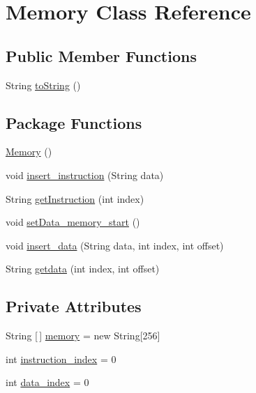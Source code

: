 \hypertarget{class_memory}{}\section{Memory Class Reference}
\label{class_memory}
\subsection*{Public Member Functions}
\begin{DoxyCompactItemize}
\item 
String \mbox{\hyperlink{class_memory_a45c16fbed000105573cba5d6b1f4e727}{to\+String}} ()
\end{DoxyCompactItemize}
\subsection*{Package Functions}
\begin{DoxyCompactItemize}
\item 
\mbox{\hyperlink{class_memory_a18ff0d806d11ea959fbb5e6357a1f63e}{Memory}} ()
\item 
void \mbox{\hyperlink{class_memory_a979bee79db15f41dc1300916ef561118}{insert\+\_\+instruction}} (String data)
\item 
String \mbox{\hyperlink{class_memory_a73c54ab9efefebf18ff0d8722dbe80e3}{get\+Instruction}} (int index)
\item 
void \mbox{\hyperlink{class_memory_a51acd7ce510413dc6834e9c5d383ae73}{set\+Data\+\_\+memory\+\_\+start}} ()
\item 
void \mbox{\hyperlink{class_memory_a29f109643d88d66008afc916eae6cea6}{insert\+\_\+data}} (String data, int index, int offset)
\item 
String \mbox{\hyperlink{class_memory_ac543412608c09b39b93b1e30a3b831a2}{getdata}} (int index, int offset)
\end{DoxyCompactItemize}
\subsection*{Private Attributes}
\begin{DoxyCompactItemize}
\item 
String \mbox{[}$\,$\mbox{]} \mbox{\hyperlink{class_memory_a3a84ec7ffdcb044c979085e5cc2498cb}{memory}} = new String\mbox{[}256\mbox{]}
\item 
int \mbox{\hyperlink{class_memory_a1a44efd4867dad33ce936039c19ad4aa}{instruction\+\_\+index}} = 0
\item 
int \mbox{\hyperlink{class_memory_a12ea5f04133e82e0eef1358bc6181747}{data\+\_\+index}} = 0
\end{DoxyCompactItemize}


